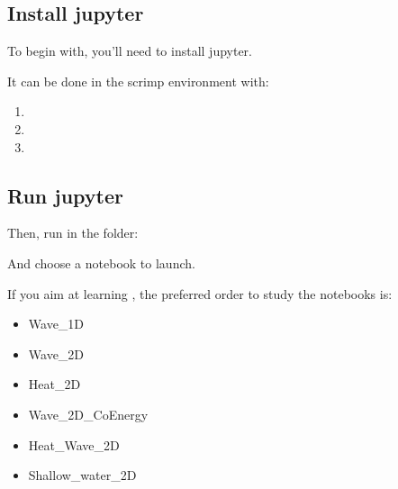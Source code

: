 \documentclass[letterpaper,10pt,english]{sphinxmanual}
\begin{document}
\subsection{Install jupyter}
\label{\detokenize{notebooks:install-jupyter}}
\sphinxAtStartPar
To begin with, you’ll need to install jupyter.

\sphinxAtStartPar
It can be done in the scrimp environment with:
\begin{enumerate}
%
\item {} 
\sphinxAtStartPar
{}

\item {} 
\sphinxAtStartPar
{}

\item {} 
\sphinxAtStartPar
{}

\end{enumerate}


\subsection{Run jupyter}
\label{\detokenize{notebooks:run-jupyter}}
\sphinxAtStartPar
Then, run in the  folder:

\sphinxAtStartPar
{}

\sphinxAtStartPar
And choose a notebook to launch.

\sphinxAtStartPar
If you aim at learning , the preferred order to study the notebooks is:
\begin{itemize}
\item {} 
\sphinxAtStartPar
Wave\_1D

\item {} 
\sphinxAtStartPar
Wave\_2D

\item {} 
\sphinxAtStartPar
Heat\_2D

\item {} 
\sphinxAtStartPar
Wave\_2D\_CoEnergy

\item {} 
\sphinxAtStartPar
Heat\_Wave\_2D

\item {} 
\sphinxAtStartPar
Shallow\_water\_2D

\end{itemize}
\end{document}
